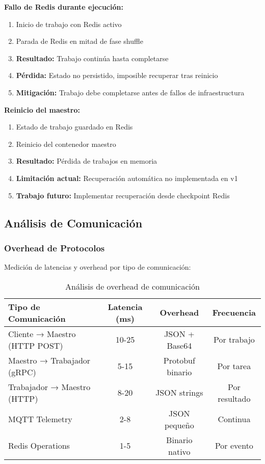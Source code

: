 \textbf{Fallo de Redis durante ejecución:}
\begin{enumerate}
    \item Inicio de trabajo con Redis activo
    \item Parada de Redis en mitad de fase shuffle
    \item \textbf{Resultado:} Trabajo continúa hasta completarse
    \item \textbf{Pérdida:} Estado no persistido, imposible recuperar tras reinicio
    \item \textbf{Mitigación:} Trabajo debe completarse antes de fallos de infraestructura
\end{enumerate}

\textbf{Reinicio del maestro:}
\begin{enumerate}
    \item Estado de trabajo guardado en Redis
    \item Reinicio del contenedor maestro
    \item \textbf{Resultado:} Pérdida de trabajos en memoria
    \item \textbf{Limitación actual:} Recuperación automática no implementada en v1
    \item \textbf{Trabajo futuro:} Implementar recuperación desde checkpoint Redis
\end{enumerate}

\subsection{Análisis de Comunicación}

\subsubsection{Overhead de Protocolos}

Medición de latencias y overhead por tipo de comunicación:

\begin{table}[H]
\centering
\begin{tabular}{|l|c|c|c|}
\hline
\textbf{Tipo de Comunicación} & \textbf{Latencia (ms)} & \textbf{Overhead} & \textbf{Frecuencia} \\
\hline
Cliente → Maestro (HTTP POST) & 10-25 & JSON + Base64 & Por trabajo \\
Maestro → Trabajador (gRPC) & 5-15 & Protobuf binario & Por tarea \\
Trabajador → Maestro (HTTP) & 8-20 & JSON strings & Por resultado \\
MQTT Telemetry & 2-8 & JSON pequeño & Continua \\
Redis Operations & 1-5 & Binario nativo & Por evento \\
\hline
\end{tabular}
\caption{Análisis de overhead de comunicación}
\label{table:communication}
\end{table}

